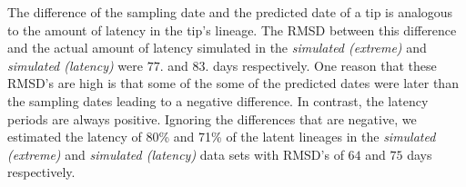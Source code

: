 \documentclass[12pt]{article}
\begin{document}
The difference of the sampling date and the predicted date of a tip is analogous to the amount of latency in the tip's lineage.
The RMSD between this difference and the actual amount of latency simulated in the \emph{simulated (extreme)} and \emph{simulated (latency)} were $77.$ and $83.$ days respectively.
One reason that these RMSD's are high is that some of the some of the predicted dates were later than the sampling dates leading to a negative difference.
In contrast, the latency periods are always positive.
Ignoring the differences that are negative, we estimated the latency of 80\% and 71\% of the latent lineages in the \emph{simulated (extreme)} and \emph{simulated (latency)} data sets with RMSD's of $64$ and $75$ days respectively.



\end{document}

